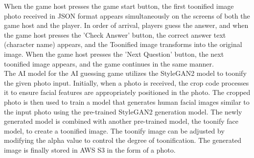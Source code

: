 \documentclass[conference]{IEEEtran}
\begin{document}
        When the game host presses the game start button, the first toonified image photo received in JSON format appears simultaneously on the screens of both the game host and the player. In order of arrival, players guess the answer, and when the game host presses the 'Check Answer' button, the correct answer text (character name) appears, and the Toonified image transforms into the original image. When the game host presses the 'Next Question' button, the next toonified image appears, and the game continues in the same manner.\\
        The AI model for the AI guessing game utilizes the StyleGAN2 model to toonify the given photo input. Initially, when a photo is received, the crop code processes it to ensure facial features are appropriately positioned in the photo. The cropped photo is then used to train a model that generates human facial images similar to the input photo using the pre-trained StyleGAN2 generation model. The newly generated model is combined with another pre-trained model, the toonify face model, to create a toonified image. The toonify image can be adjusted by modifying the alpha value to control the degree of toonification. The generated image is finally stored in AWS S3 in the form of a photo.
\end{document}
